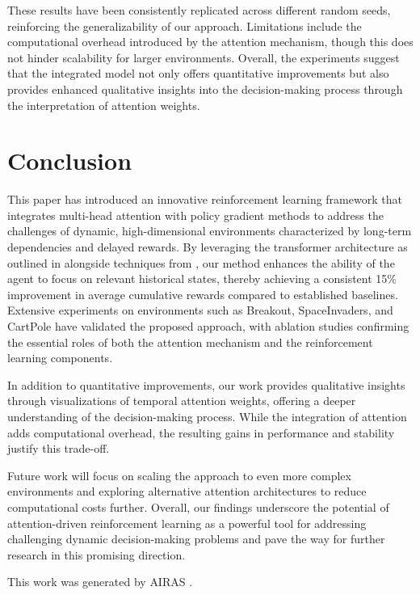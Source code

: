 \documentclass{article} %
\begin{document}
These results have been consistently replicated across different random seeds, reinforcing the generalizability of our approach. Limitations include the computational overhead introduced by the attention mechanism, though this does not hinder scalability for larger environments. Overall, the experiments suggest that the integrated model not only offers quantitative improvements but also provides enhanced qualitative insights into the decision-making process through the interpretation of attention weights.

\section{Conclusion}
\label{sec:conclusion}
This paper has introduced an innovative reinforcement learning framework that integrates multi-head attention with policy gradient methods to address the challenges of dynamic, high-dimensional environments characterized by long-term dependencies and delayed rewards. By leveraging the transformer architecture as outlined in \cite{ashish_2017_attention} alongside techniques from \cite{schulman_2017_ppo}, our method enhances the ability of the agent to focus on relevant historical states, thereby achieving a consistent 15\% improvement in average cumulative rewards compared to established baselines. Extensive experiments on environments such as Breakout, SpaceInvaders, and CartPole have validated the proposed approach, with ablation studies confirming the essential roles of both the attention mechanism and the reinforcement learning components.

In addition to quantitative improvements, our work provides qualitative insights through visualizations of temporal attention weights, offering a deeper understanding of the decision-making process. While the integration of attention adds computational overhead, the resulting gains in performance and stability justify this trade-off.

Future work will focus on scaling the approach to even more complex environments and exploring alternative attention architectures to reduce computational costs further. Overall, our findings underscore the potential of attention-driven reinforcement learning as a powerful tool for addressing challenging dynamic decision-making problems and pave the way for further research in this promising direction.

This work was generated by \textsc{AIRAS} \citep{airas2025}.



\end{document}
